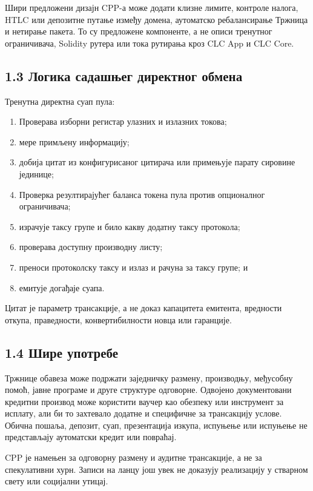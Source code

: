 \documentclass[11pt]{article}
\begin{document}
Шири предложени дизајн CPP-а може додати клизне лимите, контроле налога, HTLC или депозитне путање између домена, аутоматско ребалансирање Тржница и нетирање пакета. То су предложене компоненте, а не описи тренутног ограничивача, Solidity рутера или тока рутирања кроз CLC App и CLC Core.

\subsection*{1.3 Логика садашњег директног обмена}

Тренутна директна суап пула:

\begin{enumerate}[leftmargin=*]
\item Проверава изборни регистар улазних и излазних токова;
\item мере примљену информацију;
\item добија цитат из конфигурисаног цитирача или примењује парату сировине јединице;
\item Проверка резултирајућег баланса токена пула против опционалног ограничивача;
\item израчује таксу групе и било какву додатну таксу протокола;
\item проверава доступну производну листу;
\item преноси протоколску таксу и излаз и рачуна за таксу групе; и
\item емитује догађаје суапа.
\end{enumerate}
Цитат је параметр трансакције, а не доказ капацитета емитента, вредности откупа, праведности, конвертибилности новца или гаранције.

\subsection*{1.4 Шире употребе}

Тржнице обавеза може подржати заједничку размену, производњу, међусобну помоћ, јавне програме и друге структуре одговорне. Одвојено документовани кредитни производ може користити ваучер као обезпеку или инструмент за исплату, али би то захтевало додатне и специфичне за трансакцију услове. Обична пошаља, депозит, суап, презентација изкупа, испуњење или испуњење не представљају аутоматски кредит или повраћај.

CPP је намењен за одговорну размену и аудитне трансакције, а не за спекулативни хурн. Записи на ланцу још увек не доказују реализацију у стварном свету или социјални утицај.
\end{document}
